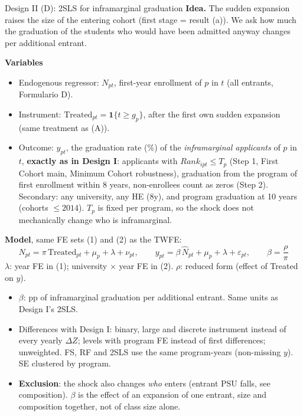 \documentclass{beamer}
\begin{document}
\begin{frame}{Design II (D): 2SLS for inframarginal graduation}
\scriptsize
\setlength{\abovedisplayskip}{2pt}
\setlength{\belowdisplayskip}{2pt}
\textbf{Idea.} The sudden expansion raises the size of the entering cohort (first stage = result (a)). We ask how much the graduation of the
students who would have been admitted anyway changes per additional entrant.

\vspace{0.06cm}
\textbf{Variables}
\begin{itemize}
    \item Endogenous regressor: $N_{pt}$, first-year enrollment of $p$ in $t$ (all entrants, Formulario D).
    \item Instrument: $\text{Treated}_{pt}=\mathbf 1\{t\ge g_p\}$, after the first own sudden expansion (same treatment as (A)).
    \item Outcome: $y_{pt}$, the graduation rate (\%) of the \emph{inframarginal applicants} of $p$ in $t$, \textbf{exactly as in Design I}:
    applicants with $Rank_{ipt}\le T_p$ (Step 1, First Cohort main, Minimum Cohort robustness), graduation from the program of first enrollment
    within 8 years, non-enrollees count as zeros (Step 2). Secondary: any university, any HE (8y), and program graduation at 10 years (cohorts $\le 2014$).
    $T_p$ is fixed per program, so the shock does not mechanically change who is inframarginal.
\end{itemize}

\textbf{Model}, same FE sets (1) and (2) as the TWFE:
\[
N_{pt}=\pi\,\text{Treated}_{pt}+\mu_p+\lambda+\nu_{pt},
\qquad
y_{pt}=\beta\,\widehat N_{pt}+\mu_p+\lambda+\varepsilon_{pt},
\qquad \beta=\frac{\rho}{\pi}
\]
{\tiny $\lambda$: year FE in (1); university $\times$ year FE in (2). $\rho$: reduced form (effect of Treated on $y$).}
\begin{itemize}
    \item $\beta$: pp of inframarginal graduation per additional entrant. Same units as Design I's 2SLS.
    \item Differences with Design I: binary, large and discrete instrument instead of every yearly $\Delta Z$; levels with program FE instead of first differences;
    unweighted. FS, RF and 2SLS use the same program-years (non-missing $y$). SE clustered by program.
    \item \textbf{Exclusion}: the shock also changes \emph{who} enters (entrant PSU falls, see composition). $\beta$ is the effect of an expansion of
    one entrant, size and composition together, not of class size alone.
\end{itemize}
\end{frame}
\end{document}
